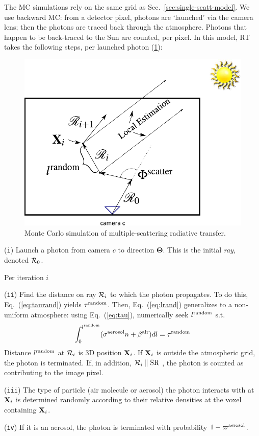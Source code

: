 \documentclass[10pt,letterpaper]{article}
\newcommand{\yoavcomment}[1]{}
\renewcommand{\yoavcomment}[1]{#1} %
\begin{document}
The MC simulations rely on the same grid as
Sec.~\ref{sec:single-scatt-model}. We use backward MC: from a detector
pixel, photons are `launched' via the camera lens; then the photons
are traced back through the atmosphere. Photons that happen to be
back-traced to the Sun are counted, per pixel. In this model, RT takes
the following steps, per launched photon (\cref{fig:mcgrid}):
\begin{figure}
  \centering
  \yoavcomment{\includegraphics[width=0.5\linewidth]{images/mcgrid.pdf}}
  \caption{\small Monte Carlo simulation of multiple-scattering
    radiative transfer.}
  \label{fig:mcgrid}
\end{figure}

\noindent ({\tt i}) Launch a photon from camera $c$ to direction
${\bm{\Theta}}$. This is the initial {\em ray}, denoted ${\cal R}_0$.

\noindent Per iteration $i$

\noindent ({\tt ii}) Find the distance on ray ${\cal R}_{i}$ to which
the photon propagates. To do this, Eq.~(\ref{eq:taurand}) yields
$\tau^{\rm random}$. Then, Eq.~(\ref{eq:lrand}) generalizes to a
non-uniform atmosphere: using Eq.~(\ref{eq:tau}), numerically seek
$l^{\rm random}$ s.t.
\begin{align}
  \int_0^{l^{\rm random}}(\sigma^{\rm aerosol} n +\beta^{\rm air}) dl
  = \tau^{\rm random}
  \label{eq:MCextinct}
\end{align}
Distance $l^{\rm random}$ at ${\cal R}_{i}$ is 3D position ${\bf
  X}_{i}$.  If ${\bf X}_{i}$ is outside the atmospheric grid, the
photon is terminated. If, in addition, ${\cal R}_{i}\parallel {\rm
  SR}$ , the photon is counted as contributing to the image pixel.

\noindent ({\tt iii}) The type of particle (air molecule or aerosol)
the photon interacts with at ${\bf X}_{i}$ is determined randomly
according to their relative densities at the voxel containing ${\bf
  X}_{i}$.

\noindent ({\tt iv}) If it is an aerosol, the photon is terminated
with probability $1-\varpi^{\rm aerosol}$.
\end{document}
